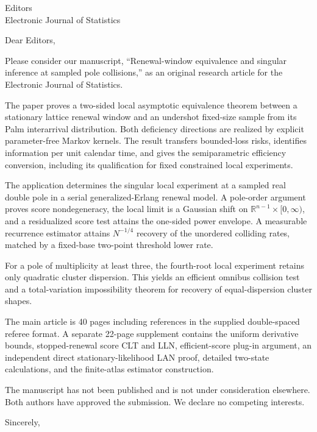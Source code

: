 \documentclass[12pt]{letter}
\date{}
\begin{document}
\begin{letter}{Editors\\Electronic Journal of Statistics}
\opening{Dear Editors,}

Please consider our manuscript, ``Renewal-window equivalence and singular
inference at sampled pole collisions,'' as an original research article for the
Electronic Journal of Statistics.

The paper proves a two-sided local asymptotic equivalence theorem between a
stationary lattice renewal window and an undershot fixed-size sample from its
Palm interarrival distribution.  Both deficiency directions are realized by
explicit parameter-free Markov kernels.  The result transfers bounded-loss
risks, identifies information per unit calendar time, and gives the
semiparametric efficiency conversion, including its qualification for fixed
constrained local experiments.

The application determines the singular local experiment at a sampled real
double pole in a serial generalized-Erlang renewal model.  A
pole-order argument proves score nondegeneracy, the local limit is a Gaussian
shift on \(\mathbb R^{n-1}\times[0,\infty)\), and a residualized score test
attains the one-sided power envelope.  A measurable recurrence estimator
attains \(N^{-1/4}\) recovery of the unordered colliding rates, matched by a
fixed-base two-point threshold lower rate.

For a pole of multiplicity at least three, the fourth-root local experiment
retains only quadratic cluster dispersion.  This yields an efficient omnibus
collision test and a total-variation impossibility theorem for recovery of
equal-dispersion cluster shapes.

The main article is 40 pages including references in the supplied
double-spaced referee format.  A separate 22-page supplement contains the
uniform derivative bounds, stopped-renewal score CLT and LLN, efficient-score
plug-in argument, an independent direct stationary-likelihood LAN proof,
detailed two-state calculations, and the finite-atlas estimator construction.

The manuscript has not been published and is not under consideration
elsewhere.  Both authors have approved the submission.  We declare no
competing interests.

\closing{Sincerely,}
\end{letter}
\end{document}
